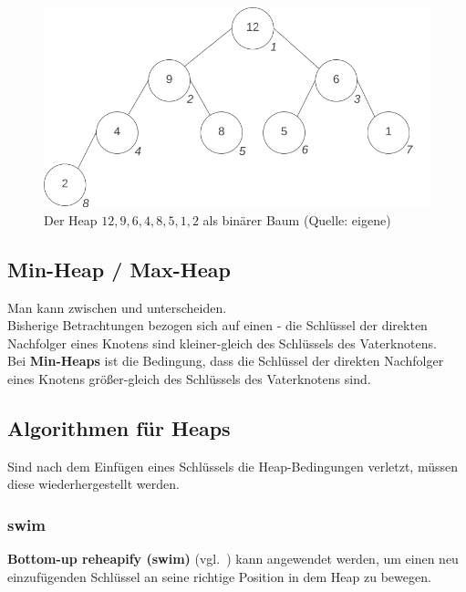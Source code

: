 \begin{figure}
    \begin{center}
        \includegraphics[scale=0.4]{chapters/Datenstrukturen und Algorithmen/img/heaptree}
        \caption{Der Heap  $12, 9, 6, 4, 8, 5, 1, 2$ als binärer Baum (Quelle: eigene)}
        \label{fig:heaptree}
    \end{center}
\end{figure}

\subsection{Min-Heap / Max-Heap}
Man kann zwischen  und  unterscheiden.\\
Bisherige Betrachtungen bezogen sich auf einen  - die Schlüssel der direkten Nachfolger eines Knotens sind kleiner-gleich des Schlüssels des Vaterknotens.\\
Bei \textbf{Min-Heaps} ist die Bedingung, dass die Schlüssel der direkten Nachfolger eines Knotens größer-gleich des Schlüssels des Vaterknotens sind.\\

\subsection{Algorithmen für Heaps}
Sind nach dem Einfügen eines Schlüssels die Heap-Bedingungen verletzt, müssen diese wiederhergestellt werden.

\subsubsection{swim}

\textbf{Bottom-up reheapify (swim)} (vgl.~\cite[315]{SW11}) kann angewendet werden, um einen neu einzufügenden Schlüssel an seine richtige Position in dem Heap zu bewegen.

